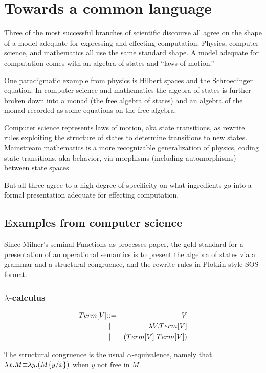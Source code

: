 \section{Towards a common language}
Three of the most successful branches of scientific discourse all agree on the shape of a model adequate for expressing and effecting computation. Physics, computer science, and mathematics all use the same standard shape. A model adequate for computation comes with an algebra of states and “laws of motion.”


One paradigmatic example from physics is Hilbert spaces and the Schroedinger equation. In computer science and mathematics the algebra of states is further broken down into a monad (the free algebra of states) and an algebra of the monad recorded as some equations on the free algebra.


Computer science represents laws of motion, aka state transitions, as rewrite rules exploiting the structure of states to determine transitions to new states. Mainstream mathematics is a more recognizable generalization of physics, coding state transitions, aka behavior, via morphisms (including automorphisms) between state spaces.


But all three agree to a high degree of specificity on what ingredients go into a formal presentation adequate for effecting computation.

\subsection{Examples from computer science}
Since Milner's seminal Functions as processes paper, the gold standard for a presentation of an operational semantics is to present the algebra of states via a grammar and a structural congruence, and the rewrite rules in Plotkin-style SOS format.

\subsubsection{$\lambda$-calculus}

\begin{eqnarray*}
  Term[V] & \mathbin{\mathbf{::=}} & V \\
  & \;\mathbin{\mathbf\mid}\; & \lambda V.Term[V] \\
  & \;\mathbin{\mathbf\mid}\; & \mathsf{(} Term[V] \; Term[V] \mathsf{)}
\end{eqnarray*}

The structural congruence is the usual $\alpha$-equivalence, namely that $\lambda x.M \mathsf{\equiv} \lambda y.(M\{y / x\})$ when $y$ not free in $M$.

